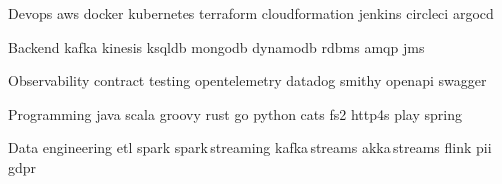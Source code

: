 
\begin{cvskills}

  \cvskill
    {Devops} %
    {aws {} docker {} kubernetes {} terraform {} cloudformation {} jenkins {} circleci {} argocd} %

  \cvskill
    {Backend} %
    {kafka {} kinesis {} ksqldb {} mongodb {} dynamodb {} rdbms {} amqp {} jms} %

\cvskill
    {Observability} %
    {contract testing {} opentelemetry {} datadog {} smithy {} openapi {} swagger} %

  \cvskill
    {Programming} %
    {java {} scala {} groovy {} rust {} go {} python {} cats {} fs2 {} http4s {} play {} spring} %

\cvskill
    {Data engineering} %
    {etl {} spark {} spark\,streaming {} kafka\,streams {} akka\,streams {} flink {} pii {} gdpr} %

\end{cvskills}
